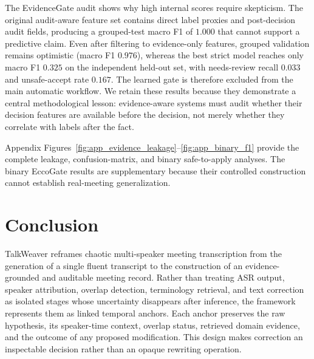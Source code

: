 \documentclass[10pt,twocolumn]{article}
\begin{document}
The EvidenceGate audit shows why high internal scores require skepticism. The original audit-aware feature set contains direct label proxies and post-decision audit fields, producing a grouped-test macro F1 of \(1.000\) that cannot support a predictive claim. Even after filtering to evidence-only features, grouped validation remains optimistic (macro F1 \(0.976\)), whereas the best strict model reaches only macro F1 \(0.325\) on the independent held-out set, with needs-review recall \(0.033\) and unsafe-accept rate \(0.167\). The learned gate is therefore excluded from the main automatic workflow. We retain these results because they demonstrate a central methodological lesson: evidence-aware systems must audit whether their decision features are available before the decision, not merely whether they correlate with labels after the fact.


Appendix Figures~\ref{fig:app_evidence_leakage}--\ref{fig:app_binary_f1} provide the complete leakage, confusion-matrix, and binary safe-to-apply analyses. The binary EccoGate results are supplementary because their controlled construction cannot establish real-meeting generalization.




\section{Conclusion}

TalkWeaver reframes chaotic multi-speaker meeting transcription from the generation of a single fluent transcript to the construction of an evidence-grounded and auditable meeting record. Rather than treating ASR output, speaker attribution, overlap detection, terminology retrieval, and text correction as isolated stages whose uncertainty disappears after inference, the framework represents them as linked temporal anchors. Each anchor preserves the raw hypothesis, its speaker-time context, overlap status, retrieved domain evidence, and the outcome of any proposed modification. This design makes correction an inspectable decision rather than an opaque rewriting operation.
\end{document}
